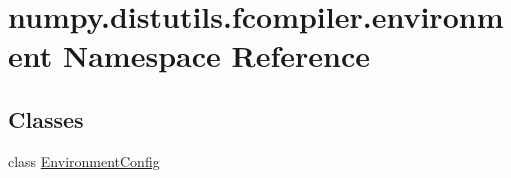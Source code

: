 \hypertarget{namespacenumpy_1_1distutils_1_1fcompiler_1_1environment}{}\section{numpy.\+distutils.\+fcompiler.\+environment Namespace Reference}
\label{namespacenumpy_1_1distutils_1_1fcompiler_1_1environment}
\subsection*{Classes}
\begin{DoxyCompactItemize}
\item 
class \hyperlink{classnumpy_1_1distutils_1_1fcompiler_1_1environment_1_1EnvironmentConfig}{Environment\+Config}
\end{DoxyCompactItemize}

